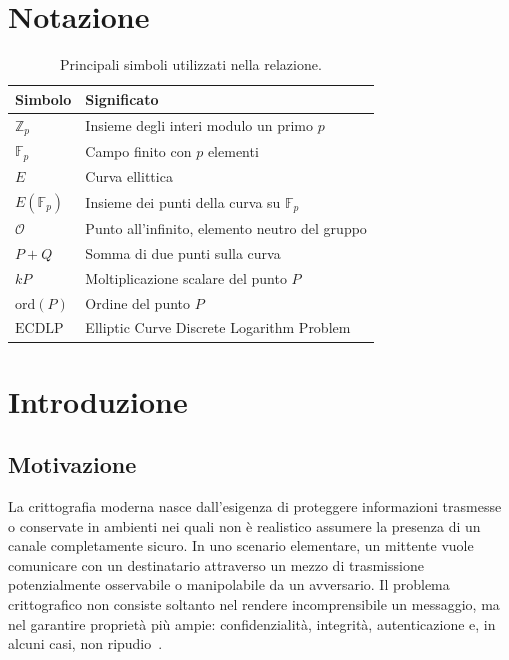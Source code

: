 \documentclass[12pt,a4paper,oneside]{report}
\newcommand{\OO}{\mathcal{O}}
\newcommand{\ECDLP}{\mathrm{ECDLP}}
\newcommand{\ord}{\mathrm{ord}}
\begin{document}
\tableofcontents
\listoftables

\chapter*{Notazione}

\begin{table}[h]
\centering
\begin{tabular}{ll}
\toprule
\textbf{Simbolo} & \textbf{Significato} \\
\midrule
$\mathbb{Z}_p$ & Insieme degli interi modulo un primo $p$ \\
$\mathbb{F}_p$ & Campo finito con $p$ elementi \\
$E$ & Curva ellittica \\
$E(\mathbb{F}_p)$ & Insieme dei punti della curva su $\mathbb{F}_p$ \\
$\OO$ & Punto all'infinito, elemento neutro del gruppo \\
$P+Q$ & Somma di due punti sulla curva \\
$kP$ & Moltiplicazione scalare del punto $P$ \\
$\ord(P)$ & Ordine del punto $P$ \\
$\ECDLP$ & Elliptic Curve Discrete Logarithm Problem \\
\bottomrule
\end{tabular}
\caption{Principali simboli utilizzati nella relazione.}
\end{table}

\clearpage
{}

\chapter{Introduzione}

\section{Motivazione}

La crittografia moderna nasce dall'esigenza di proteggere informazioni trasmesse o conservate in ambienti nei quali non è realistico assumere la presenza di un canale completamente sicuro. In uno scenario elementare, un mittente vuole comunicare con un destinatario attraverso un mezzo di trasmissione potenzialmente osservabile o manipolabile da un avversario. Il problema crittografico non consiste soltanto nel rendere incomprensibile un messaggio, ma nel garantire proprietà più ampie: confidenzialità, integrità, autenticazione e, in alcuni casi, non ripudio~\cite{margara_intro,margara_firma}.
\end{document}
